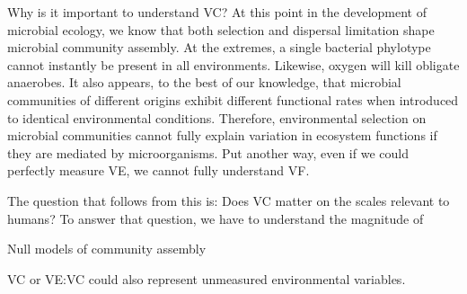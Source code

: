 \documentclass{article}
\begin{document}
Why is it important to understand VC?  At this point in the development of
microbial ecology, we know that both selection and dispersal limitation shape
microbial community assembly. At the extremes, a single bacterial phylotype
cannot instantly be present in all environments. Likewise, oxygen will kill
obligate anaerobes. It also appears, to the best of our knowledge, that
microbial communities of different origins exhibit different functional rates
when introduced to identical environmental conditions. Therefore, environmental
selection on microbial communities cannot fully explain variation in ecosystem
functions if they are mediated by microorganisms. Put another way, even if we
could perfectly measure VE, we cannot fully understand VF.

The question that follows from this is: Does VC matter on the scales relevant to
humans? To answer that question, we have to understand the magnitude of 

Null models of community assembly
 
VC or VE:VC could also represent unmeasured environmental variables.

 

\end{document}
